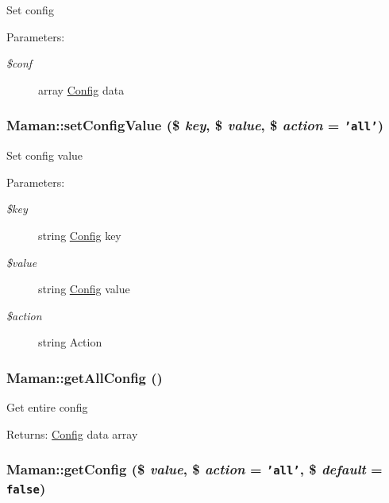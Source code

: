 Set config

\begin{Desc}
\item[Parameters:]
\begin{description}
\item[{\em \$conf}]array \hyperlink{classConfig}{Config} data \end{description}
\end{Desc}
\hypertarget{classMaman_40fc78b70fd28c5dd4443c4980c0d537}{
\subsubsection[setConfigValue]{\setlength{\rightskip}{0pt plus 5cm}Maman::setConfigValue (\$ {\em key}, \/  \$ {\em value}, \/  \$ {\em action} = {\tt 'all'})}}
\label{classMaman_40fc78b70fd28c5dd4443c4980c0d537}


Set config value

\begin{Desc}
\item[Parameters:]
\begin{description}
\item[{\em \$key}]string \hyperlink{classConfig}{Config} key \item[{\em \$value}]string \hyperlink{classConfig}{Config} value \item[{\em \$action}]string Action \end{description}
\end{Desc}
\hypertarget{classMaman_e3137d9634b06c493ad9626b558e851f}{
\subsubsection[getAllConfig]{\setlength{\rightskip}{0pt plus 5cm}Maman::getAllConfig ()}}
\label{classMaman_e3137d9634b06c493ad9626b558e851f}


Get entire config

\begin{Desc}
\item[Returns:]\hyperlink{classConfig}{Config} data array \end{Desc}
\hypertarget{classMaman_ef4fcde3f5213d79a16b471788934436}{
\subsubsection[getConfig]{\setlength{\rightskip}{0pt plus 5cm}Maman::getConfig (\$ {\em value}, \/  \$ {\em action} = {\tt 'all'}, \/  \$ {\em default} = {\tt false})}}
\label{classMaman_ef4fcde3f5213d79a16b471788934436}


